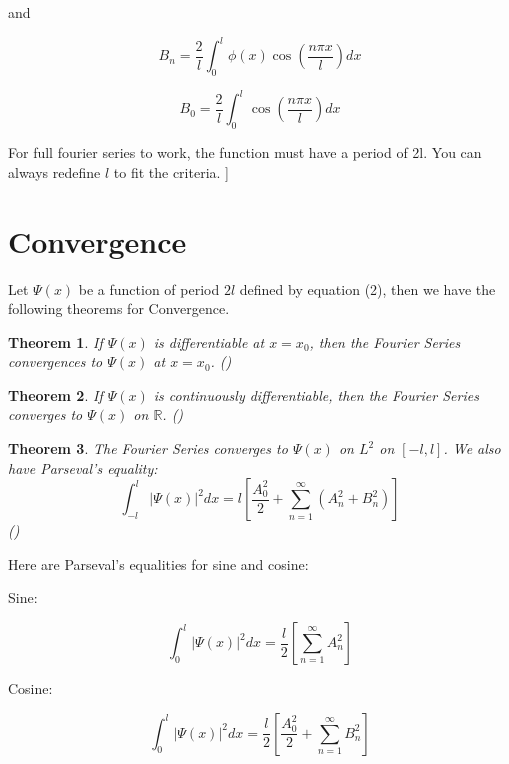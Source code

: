 \documentclass{article}
\newtheorem{theorem}{Theorem}[section]
\begin{document}
and

\begin{equation}
    B_n = \frac{2}{l}\int_{0}^{l}\phi(x)\cos(\frac{n\pi x}{l})dx
\end{equation}

\begin{equation}
    B_0 = \frac{2}{l}\int_{0}^{l}\cos(\frac{n\pi x}{l})dx
\end{equation}

For full fourier series to work, the function must have a period of 2l. You can always redefine $l$ to fit the criteria. ]

\section*{Convergence}

Let $\Psi(x)$ be a function of period $2l$ defined by equation (2), then we have the following theorems for Convergence. 

\begin{theorem}
    If $\Psi(x)$ is differentiable at $x = x_0$, then the Fourier Series convergences to $\Psi(x)$ at $x = x_0$. ()
\end{theorem}

\begin{theorem}
    If $\Psi(x)$ is continuously differentiable, then the Fourier Series converges to $\Psi(x)$ on $\mathbb{R}$. ()
\end{theorem}

\begin{theorem}
    The Fourier Series converges to $\Psi(x)$ on $L^2$ on $[-l, l]$. We also have Parseval's equality:
    \begin{equation}
        \int_{-l}^{l}|\Psi(x)|^2dx = l[\frac{A_0^2}{2} + \sum_{n=1}^{\infty}(A_n^2 + B_n^2)]
    \end{equation}
    ()
\end{theorem}

Here are Parseval's equalities for sine and cosine:

Sine:

\begin{equation}
    \int_{0}^{l}|\Psi(x)|^2dx = \frac{l}{2}[\sum_{n=1}^{\infty}A_n^2]
\end{equation}

Cosine:

\begin{equation}
    \int_{0}^{l}|\Psi(x)|^2dx = \frac{l}{2}[\frac{A_0^2}{2} + \sum_{n=1}^{\infty}B_n^2]
\end{equation}
\end{document}
